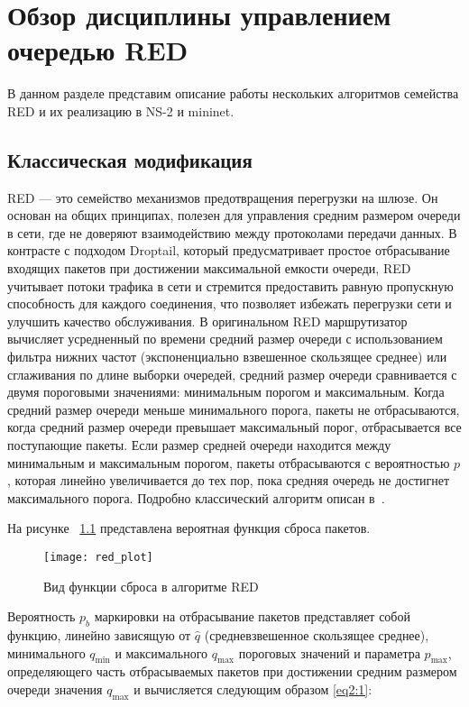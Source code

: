 \chapter{Обзор дисциплины управлением очередью RED}
\label{chap2}

В данном разделе представим описание работы нескольких алгоритмов семейства RED и их реализацию в NS-2 и mininet. 

\section{Классическая модификация}
\label{chap2:sec1}

RED — это семейство механизмов предотвращения перегрузки
на шлюзе. Он основан на общих принципах, полезен для управления
средним размером очереди в сети, где не доверяют взаимодействию между
протоколами передачи данных. В контрасте с подходом Droptail, который предусматривает 
простое отбрасывание входящих пакетов при достижении максимальной емкости очереди, RED учитывает
потоки трафика в сети и стремится предоставить равную пропускную
способность для каждого соединения, что позволяет избежать перегрузки
сети и улучшить качество обслуживания. В оригинальном RED
маршрутизатор вычисляет усредненный по времени средний размер очереди
с использованием фильтра нижних частот (экспоненциально взвешенное
скользящее среднее) или сглаживания по длине выборки очередей, средний
размер очереди сравнивается с двумя пороговыми значениями: минимальным
порогом и максимальным. Когда средний размер очереди меньше
минимального порога, пакеты не отбрасываются, когда средний размер
очереди превышает максимальный порог, отбрасывается все поступающие
пакеты. Если размер средней очереди находится между минимальным и
максимальным порогом, пакеты отбрасываются с вероятностью $p$, которая
линейно увеличивается до тех пор, пока средняя очередь не достигнет
максимального порога. Подробно классический алгоритм описан в~\cite{RED1, RED0}.


На рисунке ~\ref{fig1} представлена вероятная функция сброса пакетов.
 
\begin{figure}[h!]
 \centerline{\texttt{[image: red\_plot]}}
 \caption{Вид функции сброса в алгоритме RED}
\label{fig1}
\end{figure}


Вероятность $p_{b}$ маркировки на отбрасывание пакетов представляет
собой функцию, линейно зависящую от $\hat{q}$ (средневзвешенное
скользящее среднее), минимального $q_{\min}$ и максимального
$q_{\max}$ пороговых значений и параметра $p_{\max}$, определяющего
часть отбрасываемых пакетов при достижении средним размером очереди
значения $q_{\max}$ и вычисляется следующим образом \eqref{eq2:1}:

